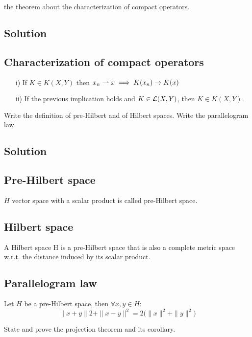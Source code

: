 
\question
the theorem about the characterization of compact operators.

\subsection*{Solution}

\subsection{Characterization of compact operators}
\begin{itemize}
    \item[i)] If $K\in K(X,Y)$ then $x_n \rightharpoonup x \implies K(x_n)\to K(x)$ 
    \item[ii)] If the previous implication holds and $K\in \mathcal{L}(X,Y)$, then $K\in K(X,Y)$.
\end{itemize}


\question
Write the definition of pre-Hilbert and of Hilbert spaces. Write the parallelogram law.

\subsection*{Solution}

\subsection{Pre-Hilbert space}
$H$ vector space with a scalar product is called pre-Hilbert space.

\subsection{Hilbert space}
A Hilbert space H is a pre-Hilbert space that is also a complete metric space w.r.t. the distance induced by its scalar product.

\subsection{Parallelogram law}
Let $H$ be a pre-Hilbert space, then $\forall x,y\in H:$\[
\|x+y\|2+\|x-y\|^2 = 2\big(\|x \|^2+\|y\|^2\big)\]


\question
State and prove the projection theorem and its corollary.

